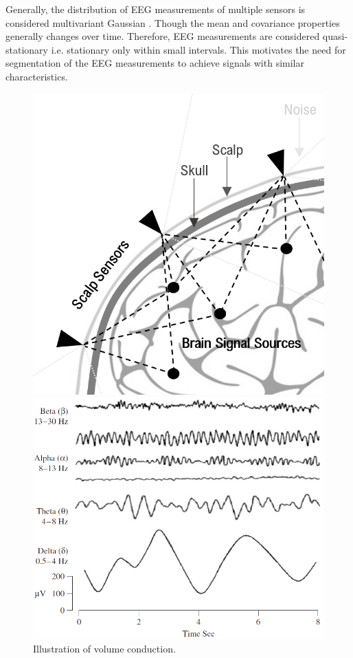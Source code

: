 Generally, the distribution of EEG measurements of multiple sensors is considered multivariant Gaussian \cite[p. 50]{EEGsignalprocessing}. Though the mean and covariance properties generally changes over time. Therefore, EEG measurements are considered quasi-stationary i.e. stationary only within small intervals. This motivates the need for segmentation of the EEG measurements to achieve signals with similar characteristics. 
\begin{figure}[H]
    \begin{minipage}[t]{.45\textwidth}
        \centering
        \includegraphics[width=\textwidth]{figures/EEG/volumeconduction.png}
        \caption{Illustration of volume conduction.}\label{fig:volumeconduction}
    \end{minipage} 
    \hfill
    \begin{minipage}[t]{.45\textwidth}
        \centering
        \includegraphics[width=\textwidth]{figures/EEG/EEG_example.png}

\end{minipage}
\end{figure}
